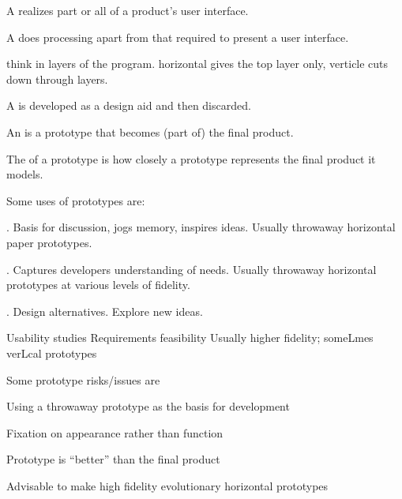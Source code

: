\begin{compactitem}
\item A  realizes part or all of a product’s user
interface.
\item A  does processing apart from that required
to present a user interface.
\begin{R} think in layers of the program. horizontal gives the top layer only, verticle cuts down through layers. \end{R}
\item A  is developed as a design aid and then
discarded.
\item An  is a prototype that becomes (part of)
the final product. 

\item The  of a prototype is how closely a prototype represents the final
product it models.

Some uses of prototypes are:
\begin{compactitem}
\item {}.
Basis for discussion, jogs memory, inspires ideas.
Usually throwaway horizontal paper prototypes.
\item {}. Captures developers understanding of needs.
Usually throwaway horizontal prototypes at various levels of fidelity.
\item {}.
Design alternatives.
Explore new ideas.
\item {}
Usability studies
Requirements feasibility
Usually higher fidelity; someLmes verLcal prototypes
\item {}
\end{compactitem}

Some prototype risks/issues are \begin{compactitem}
\item Using a throwaway prototype as the basis for development
\item Fixation on appearance rather than function
\item Prototype is “better” than the final product
\item Advisable to make high fidelity evolutionary horizontal
prototypes
\end{compactitem}



\end{compactitem}
